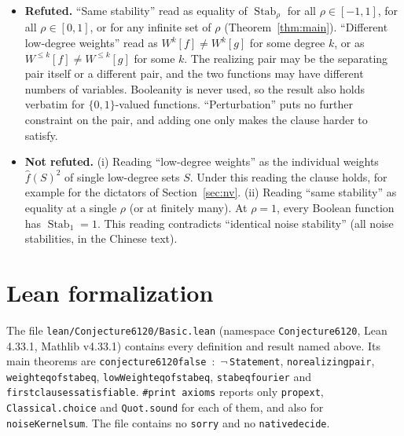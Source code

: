 \documentclass[11pt]{article}
\theoremstyle{definition}
\theoremstyle{remark}
\renewcommand{\_}{\oldus\allowbreak}
\newcommand{\Stab}{\operatorname{Stab}}
\begin{document}
\begin{itemize}
\item \textbf{Refuted.} ``Same stability'' read as equality of $\Stab_\rho$ for all
$\rho\in[-1,1]$, for all $\rho\in[0,1]$, or for any infinite set of $\rho$ (Theorem~\ref{thm:main}).
``Different low-degree weights'' read as $W^k[f]\ne W^k[g]$ for some degree $k$, or as
$W^{\le k}[f]\ne W^{\le k}[g]$ for some $k$. The realizing pair may be the separating pair itself
or a different pair, and the two functions may have different numbers of variables. Booleanity is
never used, so the result also holds verbatim for $\{0,1\}$-valued functions. ``Perturbation''
puts no further constraint on the pair, and adding one only makes the clause harder to satisfy.
\item \textbf{Not refuted.} (i) Reading ``low-degree weights'' as the individual weights
$\hat f(S)^2$ of single low-degree sets $S$. Under this reading the clause holds, for example for
the dictators of Section~\ref{sec:nv}. (ii) Reading ``same stability'' as equality at a single
$\rho$ (or at finitely many). At $\rho=1$, every Boolean function has $\Stab_1=1$. This reading
contradicts ``identical noise stability'' (all noise stabilities, in the Chinese text).
\end{itemize}

\section{Lean formalization}

The file \texttt{lean/Conjecture6120/Basic.lean} (namespace \texttt{Conjecture6120}, Lean 4.33.1,
Mathlib v4.33.1) contains every definition and result named above. Its main theorems are
\texttt{conjecture6120\_false}~:~$\neg$\,\texttt{Statement},
\texttt{no\_realizing\_pair}, \texttt{weight\_eq\_of\_stab\_eq},
\texttt{lowWeight\_eq\_of\_stab\_eq}, \texttt{stab\_eq\_fourier} and
\texttt{first\_clauses\_satisfiable}. \texttt{\#print axioms} reports only \texttt{propext},
\texttt{Classical.choice} and \texttt{Quot.sound} for each of them, and also for
\texttt{noiseKernel\_sum}. The file contains no \texttt{sorry} and no \texttt{native\_decide}.
\end{document}
